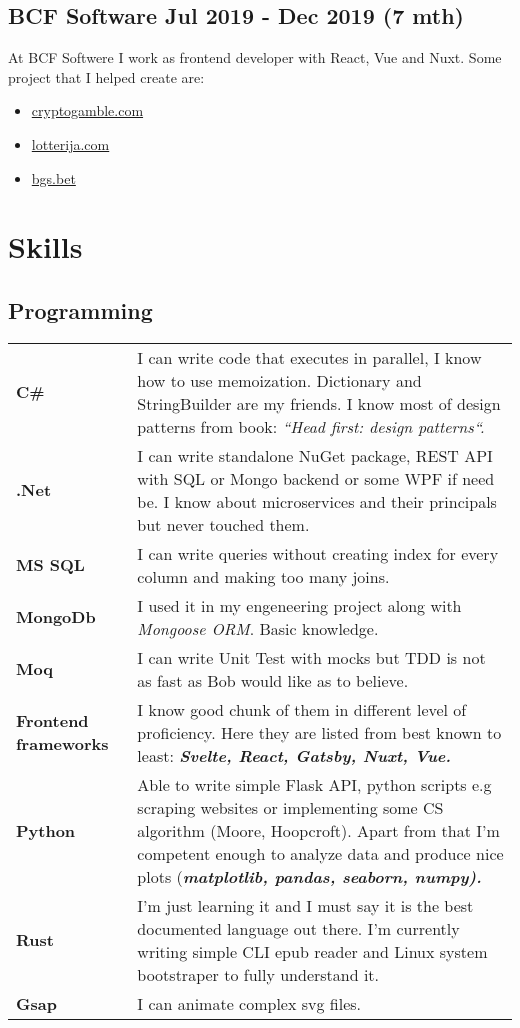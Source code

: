 \documentclass[10pt]{article}
\renewcommand{\arraystretch}{0}
\begin{document}
\subsection{BCF Software Jul 2019 - Dec 2019 (7 mth) }
At BCF Softwere I work as frontend developer with React, Vue and Nuxt. Some project that I helped create are:
\begin{itemize}
    \item \href{https://cryptogamble.com}{cryptogamble.com}
    \item \href{https://lotterija.com}{lotterija.com}
    \item \href{https://bgs.bet}{bgs.bet}
\end{itemize}
\newpage
\section{Skills}
\subsection{Programming}
\renewcommand{\arraystretch}{2.5}
\begin{table}[H]
    \begin{tabularx}{\textwidth}{@{}l X}
         \textbf{C\#} & I can write code that executes in parallel, I know how to use memoization. Dictionary and StringBuilder are my friends. I know most of design patterns from book: \em ``Head first: design patterns``.\\
         \textbf{.Net} & I can write standalone NuGet package, REST API with SQL or Mongo backend or some WPF if need be. I know about microservices and their principals but never touched them. \\
         \textbf{MS SQL} & I can write queries without creating index for every column and making too many joins. \\
         \textbf{MongoDb} & I used it in my engeneering project along with \emph{Mongoose ORM}. Basic knowledge. \\
         \textbf{Moq} & I can write Unit Test with mocks but TDD is not as fast as Bob would like as to believe.  \\
         \textbf{Frontend frameworks} & I know good chunk of them in different level of proficiency. Here they are listed from best known to least: \bfseries \em Svelte, React, Gatsby, Nuxt, Vue. \\
         \textbf{Python} & Able to write simple Flask API, python scripts e.g scraping websites or implementing some CS algorithm (Moore, Hoopcroft). Apart from that I'm competent enough to analyze data and produce nice plots (\bfseries \em matplotlib, pandas, seaborn, numpy). \\
         \textbf{Rust} & I'm just learning it and I must say it is the best documented language out there. I'm currently writing simple CLI epub reader and Linux system bootstraper to fully understand it. \\
         \textbf{Gsap} & I can animate complex svg files.\\
    \end{tabularx}
\end{table}
\end{document}
